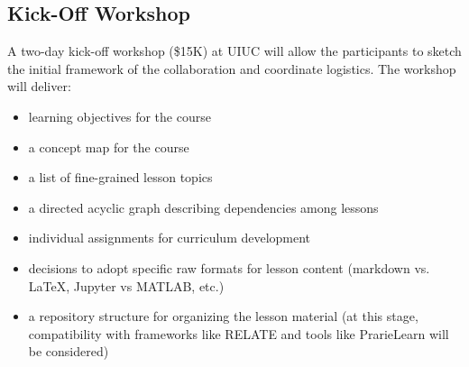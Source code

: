\documentclass[11pt]{article}
\begin{document}
\iffalse
          Doing code review at the end of the work isn't useful. What works is 
          incremental code review. This proposal suspects that the same is true 
          for curriculum review.  \cite{wilson_software_2014}.

          Education is an inherently distributed system, but this need not be a hinderance to collaboration.

          Scientists are more than happy to build upon one another's work, form 
          collaborations with others in their field. But, 
          when it comes to educating, where is the sharing of lessons learned 
          and collaboration? 
\fi

          \subsection{Kick-Off Workshop}
          A two-day kick-off workshop (\$15K) at UIUC will allow the 
          participants to sketch the initial framework of 
          the collaboration and coordinate logistics. The workshop will 
          deliver:

          \begin{itemize} 
                  \item learning objectives\cite{bloom_bloom_1984} for the 
                          course
                  \item a concept map\cite{novak_concept_1990} for the course
                  \item a list of fine-grained lesson topics
                  \item a directed acyclic graph describing dependencies among 
                          lessons
                  \item individual assignments for curriculum development
                  \item decisions to adopt specific raw formats for lesson content
                        (markdown vs. \LaTeX, Jupyter vs MATLAB, etc.)
                  \item a repository structure for organizing the lesson 
                          material (at this stage, compatibility with 
                          frameworks like RELATE 
                          \cite{kloeckner_relate_2017,kloeckner_relate_2017} 
                          and tools like PrarieLearn 
                          \cite{west_prairielearn:_2015} will be considered)
          \end{itemize} 
\end{document}
